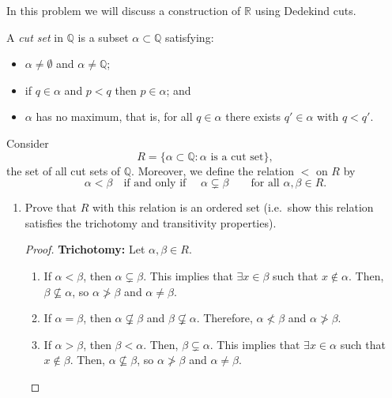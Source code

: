 \documentclass[10pt]{article}
\newcommand{\R}{\mathbb{R}}
\newcommand{\Q}{\mathbb{Q}}
\newenvironment{problem}[2][Problem]{\begin{trivlist}
\item[\hskip \labelsep {\bfseries #1}\hskip \labelsep {\bfseries #2.}]}{\end{trivlist}}
\begin{document}
\begin{problem}{2} 
	In this problem we will discuss a construction of $ \R $ using Dedekind cuts. 
	
	\noindent A \emph{cut set} in $ \Q $ is a subset $ \alpha \subset \Q $ satisfying:
	\begin{itemize}
		\item $ \alpha \neq \emptyset $ and $ \alpha \neq \Q $;
		\item if $ q \in \alpha $ and $ p < q $ then $ p \in \alpha $; and
		\item $ \alpha $ has no maximum, that is, for all $ q \in \alpha $ there exists $ q' \in \alpha $ with $ q < q' $.
	\end{itemize}
	
	\noindent Consider 
	\[ R = \{ \alpha \subset \Q : \alpha \text{ is a cut set} \}, \]
	the set of all cut sets of $ \Q $. Moreover, we define the relation $ < $ on $ R $ by  
	\[ \alpha < \beta \quad \text{if and only if } \quad \alpha \subsetneq \beta \qquad \text{for all } \alpha,\beta \in R. \] 
	\begin{enumerate}
		\item Prove that $ R $ with this relation is an ordered set (i.e.~show this relation satisfies the trichotomy and transitivity properties).
            \begin{proof}
                \textbf{Trichotomy:} Let $\alpha, \beta \in R$.
                \begin{enumerate}
                    \item If $\alpha < \beta$, then $\alpha \subsetneq \beta$.
                        This implies that $\exists x \in \beta$ such that $x \notin \alpha$. Then, $\beta \nsubseteq \alpha$, so $\alpha \not> \beta$ and $\alpha \neq \beta$.
                    \item If $\alpha = \beta$, then $\alpha \not\subsetneq \beta$ and $\beta \not\subsetneq \alpha$. Therefore, $\alpha \not < \beta$ and $\alpha \not > \beta$.
                    \item If $\alpha > \beta$, then $\beta < \alpha$. Then, $\beta \subsetneq \alpha$. This implies that $\exists x \in \alpha$ such that $x \notin \beta$. Then, $\alpha \nsubseteq \beta$, so $\alpha \not> \beta$ and $\alpha \neq \beta$.
                \end{enumerate}


\end{proof}
\end{enumerate}
\end{problem}
\end{document}
